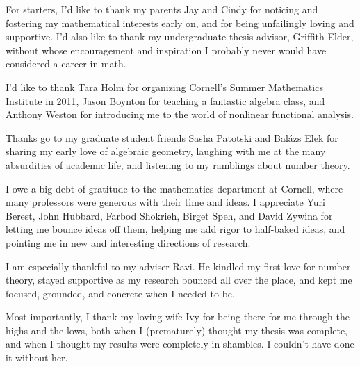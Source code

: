 \documentclass[phd,cornellheadings,tocprelim]{cornell}
\begin{document}
\begin{acknowledgements}
For starters, I'd like to thank my parents Jay and Cindy for noticing and 
fostering my mathematical interests early on, and for being unfailingly loving 
and supportive. I'd also like to thank my undergraduate thesis advisor, 
Griffith Elder, without whose encouragement and inspiration I probably never 
would have considered a career in math. 

I'd like to thank Tara Holm for organizing Cornell's Summer Mathematics 
Institute in 2011, Jason Boynton for teaching a fantastic algebra class, and 
Anthony Weston for introducing me to the world of nonlinear functional 
analysis. 

Thanks go to my graduate student friends Sasha Patotski and Bal\'azs Elek for 
sharing my early love of algebraic geometry, laughing with me at the many 
absurdities of academic life, and listening to my ramblings about number 
theory. 

I owe a big debt of gratitude to the mathematics department at Cornell, where 
many professors were generous with their time and ideas. I appreciate Yuri 
Berest, John Hubbard, Farbod Shokrieh, Birget Speh, and David Zywina for 
letting me bounce ideas off them, helping me add rigor to half-baked ideas, 
and pointing me in new and interesting directions of research. 

I am especially thankful to my adviser Ravi. He kindled my first love for 
number theory, stayed supportive as my research bounced all over the place, 
and kept me focused, grounded, and concrete when I needed to be. 

Most importantly, I thank my loving wife Ivy for being there for me 
through the highs and the lows, both when I (prematurely) thought my thesis was 
complete, and when I thought my results were completely in shambles. I couldn't 
have done it without her. 
\end{acknowledgements}

\contentspage
\normalspacing
\setcounter{page}{1}
\pagestyle{cornell}
\addtolength{\parskip}{0.5\baselineskip}

















\printbibliography[heading=bibintoc]
\end{document}
